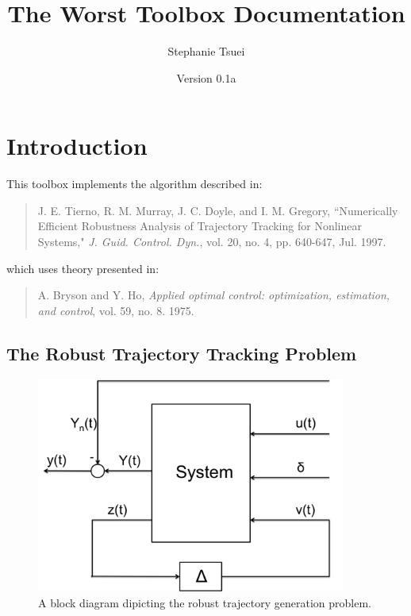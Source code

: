 \documentclass{article}
\author{Stephanie Tsuei}
\title{The Worst Toolbox Documentation}
\date{Version 0.1a}
\begin{document}
\maketitle

\section{Introduction}
This toolbox implements the algorithm described in:

\begin{quote}
J. E. Tierno, R. M. Murray, J. C. Doyle, and I. M. Gregory,
``Numerically Efficient Robustness Analysis of Trajectory Tracking for Nonlinear
Systems," \emph{J. Guid. Control. Dyn.}, vol. 20, no. 4, pp. 640-647, Jul.
1997.
\end{quote}

which uses theory presented in:

\begin{quote}
A. Bryson and Y. Ho, \emph{Applied optimal control: optimization,
estimation, and control}, vol. 59, no. 8. 1975.
\end{quote}



\subsection{The Robust Trajectory Tracking Problem}

\begin{figure}
\begin{center}
\includegraphics[width=4in]{system}
\caption{A block diagram dipicting the robust trajectory generation problem.}
\end{center}
\label{sys}
\end{figure}
\end{document}
